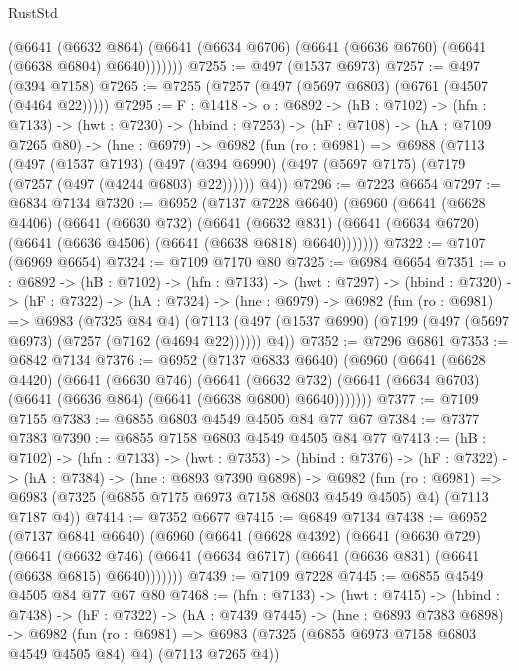 \begin{lexlean}{RustStd}
\begin{coremodule}
          (@6641
            (@6632 @864)
            (@6641 (@6634 @6706) (@6641 (@6636 @6760) (@6641 (@6638 @6804) @6640)))))))
@7255 := @497 (@1537 @6973)
@7257 := @497 (@394 @7158)
@7265 := @7255 (@7257 (@497 (@5697 @6803) (@6761 (@4507 (@4464 @22)))))
@7295 := {F : @1418} ->
  {o : @6892} ->
  (hB : @7102) ->
  (hfn : @7133) ->
  (hwt : @7230) ->
  (hbind : @7253) ->
  (hF : @7108) ->
  (hA : @7109 @7265 @80) ->
  (hne : @6979) ->
  @6982
    (fun (ro : @6981) =>
    @6988
      (@7113
        (@497
          (@1537 @7193)
          (@497 (@394 @6990) (@497 (@5697 @7175) (@7179 (@7257 (@497 (@4244 @6803) @22))))))
        @4))
@7296 := @7223 @6654
@7297 := @6834 @7134
@7320 := @6952
    (@7137 @7228 @6640)
    (@6960
      (@6641
        (@6628 @4406)
        (@6641
          (@6630 @732)
          (@6641
            (@6632 @831)
            (@6641 (@6634 @6720) (@6641 (@6636 @4506) (@6641 (@6638 @6818) @6640)))))))
@7322 := @7107 (@6969 @6654)
@7324 := @7109 @7170 @80
@7325 := @6984 @6654
@7351 := {o : @6892} ->
  (hB : @7102) ->
  (hfn : @7133) ->
  (hwt : @7297) ->
  (hbind : @7320) ->
  (hF : @7322) ->
  (hA : @7324) ->
  (hne : @6979) ->
  @6982
    (fun (ro : @6981) =>
    @6983
      (@7325 @84 @4)
      (@7113 (@497 (@1537 @6990) (@7199 (@497 (@5697 @6973) (@7257 (@7162 (@4694 @22)))))) @4))
@7352 := @7296 @6861
@7353 := @6842 @7134
@7376 := @6952
    (@7137 @6833 @6640)
    (@6960
      (@6641
        (@6628 @4420)
        (@6641
          (@6630 @746)
          (@6641
            (@6632 @732)
            (@6641 (@6634 @6703) (@6641 (@6636 @864) (@6641 (@6638 @6800) @6640)))))))
@7377 := @7109 @7155
@7383 := @6855 @6803 @4549 @4505 @84 @77 @67
@7384 := @7377 @7383
@7390 := @6855 @7158 @6803 @4549 @4505 @84 @77
@7413 := (hB : @7102) ->
  (hfn : @7133) ->
  (hwt : @7353) ->
  (hbind : @7376) ->
  (hF : @7322) ->
  (hA : @7384) ->
  (hne : @6893 @7390 @6898) ->
  @6982
    (fun (ro : @6981) =>
    @6983 (@7325 (@6855 @7175 @6973 @7158 @6803 @4549 @4505) @4) (@7113 @7187 @4))
@7414 := @7352 @6677
@7415 := @6849 @7134
@7438 := @6952
    (@7137 @6841 @6640)
    (@6960
      (@6641
        (@6628 @4392)
        (@6641
          (@6630 @729)
          (@6641
            (@6632 @746)
            (@6641 (@6634 @6717) (@6641 (@6636 @831) (@6641 (@6638 @6815) @6640)))))))
@7439 := @7109 @7228
@7445 := @6855 @4549 @4505 @84 @77 @67 @80
@7468 := (hfn : @7133) ->
  (hwt : @7415) ->
  (hbind : @7438) ->
  (hF : @7322) ->
  (hA : @7439 @7445) ->
  (hne : @6893 @7383 @6898) ->
  @6982
    (fun (ro : @6981) =>
    @6983 (@7325 (@6855 @6973 @7158 @6803 @4549 @4505 @84) @4) (@7113 @7265 @4))

\end{coremodule}
\end{lexlean}
